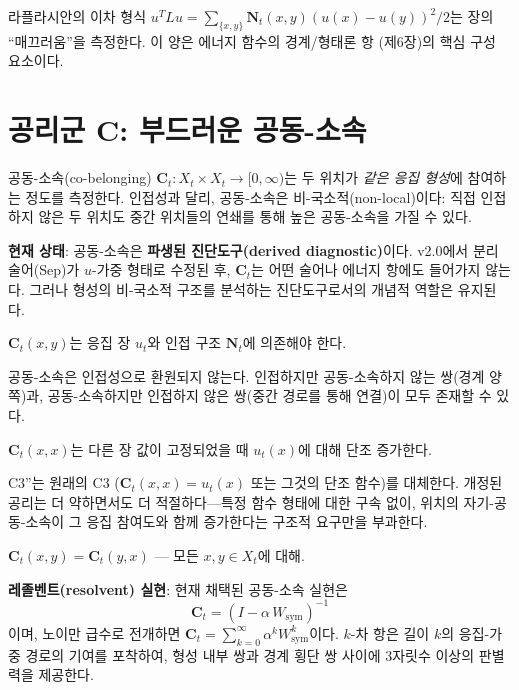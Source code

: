 라플라시안의 이차 형식 $u^T L u = \sum_{\{x,y\}} \mathbf{N}_t(x,y)(u(x) - u(y))^2 / 2$는 장의 ``매끄러움''을 측정한다. 이 양은 에너지 함수의 경계/형태론 항 (제6장)의 핵심 구성 요소이다.


\section{공리군 C: 부드러운 공동-소속}
\label{sec:group-c}

공동-소속(co-belonging) $\mathbf{C}_t : X_t \times X_t \to [0,\infty)$는 두 위치가 \emph{같은 응집 형성}에 참여하는 정도를 측정한다. 인접성과 달리, 공동-소속은 비-국소적(non-local)이다: 직접 인접하지 않은 두 위치도 중간 위치들의 연쇄를 통해 높은 공동-소속을 가질 수 있다.

\textbf{현재 상태}: 공동-소속은 \textbf{파생된 진단도구(derived diagnostic)}이다. v2.0에서 분리 술어(Sep)가 $u$-가중 형태로 수정된 후, $\mathbf{C}_t$는 어떤 술어나 에너지 항에도 들어가지 않는다. 그러나 형성의 비-국소적 구조를 분석하는 진단도구로서의 개념적 역할은 유지된다.

\begin{axiom}[C1: 응집 및 인접 의존성]
$\mathbf{C}_t(x,y)$는 응집 장 $u_t$와 인접 구조 $\mathbf{N}_t$에 의존해야 한다.
\end{axiom}

\begin{axiom}[C2: 인접성과의 구별]
공동-소속은 인접성으로 환원되지 않는다. 인접하지만 공동-소속하지 않는 쌍(경계 양쪽)과, 공동-소속하지만 인접하지 않은 쌍(중간 경로를 통해 연결)이 모두 존재할 수 있다.
\end{axiom}

\begin{axiom}[C3'': 국소 단조성]
$\mathbf{C}_t(x,x)$는 다른 장 값이 고정되었을 때 $u_t(x)$에 대해 단조 증가한다.
\end{axiom}

C3''는 원래의 C3 ($\mathbf{C}_t(x,x) = u_t(x)$ 또는 그것의 단조 함수)를 대체한다. 개정된 공리는 더 약하면서도 더 적절하다---특정 함수 형태에 대한 구속 없이, 위치의 자기-공동-소속이 그 응집 참여도와 함께 증가한다는 구조적 요구만을 부과한다.

\begin{axiom}[C4: 대칭]
$\mathbf{C}_t(x,y) = \mathbf{C}_t(y,x)$ --- 모든 $x, y \in X_t$에 대해.
\end{axiom}

\textbf{레졸벤트(resolvent) 실현}: 현재 채택된 공동-소속 실현은
\begin{equation}
    \mathbf{C}_t = (I - \alpha\, W_{\mathrm{sym}})^{-1}
\end{equation}
이며, 노이만 급수로 전개하면 $\mathbf{C}_t = \sum_{k=0}^{\infty} \alpha^k W_{\mathrm{sym}}^k$이다. $k$-차 항은 길이 $k$의 응집-가중 경로의 기여를 포착하여, 형성 내부 쌍과 경계 횡단 쌍 사이에 $3$자릿수 이상의 판별력을 제공한다.

